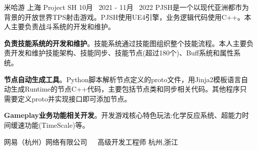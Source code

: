 


\begin{cventries}
	
\cventrycompany
{米哈游} %
{上海} %
\cventryproject
{Project SH} %
{10月~ 2021 - 11月~ 2022} %
{PJSH是一个以现代亚洲都市为背景的开放世界TPS射击游戏。PJSH使用UE4引擎，业务逻辑代码使用C++。本人主要负责战斗系统的开发和维护。}
{ %
	\begin{cvitems}
		\item {\textbf{负责技能系统的开发和维护}。技能系统通过技能图组织整个技能流程。本人主要负责开发和维护技能架构、技能同步、技能节点(超过180个)、Buff系统和属性系统。 }
		\item{\textbf{节点自动生成工具}。Python脚本解析节点定义的proto文件，用Jinja2模板语言自动生成Runtime的节点C++代码，主要包括节点类和同步相关代码。其他程序只需要定义proto并实现接口即可添加节点。}
		\item{\textbf{Gameplay业务功能相关开发}。开发游戏核心特色玩法:化学反应系统、超能力时间缓速功能(TimeScale)等。}
	\end{cvitems}
}


\cventrycompany
{网易（杭州）网络有限公司~~~高级开发工程师} %
{杭州,浙江} %


\end{cventries}
